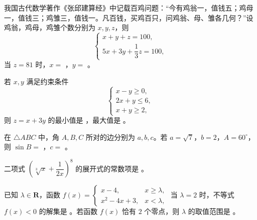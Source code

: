 \begin{question}
我国古代数学著作《张邱建算经》中记载百鸡问题：“今有鸡翁一，值钱五；鸡母一，值钱三；鸡雏三，值钱一。凡百钱，买鸡百只，问鸡翁、母、雏各几何？”设鸡翁，鸡母，鸡雏个数分别为 $x, y, z$，则
\nopagebreak[4]
\[\begin{cases} x + y + z = 100, \\ 5x + 3y + \dfrac13 z = 100, \end{cases}\]
当 $z = 81$ 时，$x =$ \underline{\hspace{2cm}}，$y =$ \underline{\hspace{2cm}}。

\end{question}
\begin{question}
若 $x, y$ 满足约束条件
\nopagebreak[4]
\[\begin{cases} x - y \geqslant 0, \\ 2x + y \leqslant 6, \\ x + y \geqslant 2, \end{cases}\]
则 $z = x + 3y$ 的最小值是 \underline{\hspace{2cm}}，最大值是 \underline{\hspace{2cm}}。

\end{question}
\begin{question}
在 $\triangle ABC$ 中，角 $A, B, C$ 所对的边分别为 $a, b, c$。若 $a = \sqrt7$，$b = 2$，$A = 60^\circ$，则 $\sin B =$ \underline{\hspace{2cm}}，$c =$ \underline{\hspace{2cm}}。

\end{question}
\begin{question}
二项式 $\left(\sqrt[3]{x} + \dfrac{1}{2x}\right)^8$ 的展开式的常数项是 \underline{\hspace{2cm}}。

\end{question}
\begin{question}
已知 $\lambda \in \mathbf R$，函数 $f(x) = \begin{cases} x - 4, & x \geqslant \lambda, \\ x^2 - 4x + 3, & x < \lambda, \end{cases}$ 当 $\lambda = 2$ 时，不等式 $f(x) < 0$ 的解集是 \underline{\hspace{2cm}}。若函数 $f(x)$ 恰有 $2$ 个零点，则 $\lambda$ 的取值范围是 \underline{\hspace{2cm}}。

\end{question}
